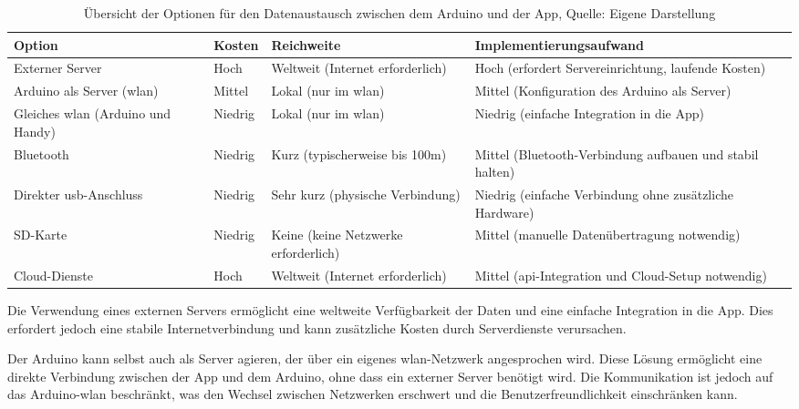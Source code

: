 \begin{table}[h!]
	\centering
	\caption{Übersicht der Optionen für den Datenaustausch zwischen dem Arduino und der App, Quelle: Eigene Darstellung}
	\label{tab:datenaustausch}
	\footnotesize
	\renewcommand{\arraystretch}{1.5} %
	\begin{tabularx}{\textwidth}{|X|X|X|>{\raggedright\arraybackslash}p{}|}
		\hline
		\textbf{Option} & \textbf{Kosten} & \textbf{Reichweite} & \textbf{Implementierungsaufwand} \\ \hline
		Externer Server & Hoch & Weltweit (Internet erforderlich) & Hoch (erfordert Servereinrichtung, laufende Kosten) \\ \hline
		Arduino als Server (\ac{wlan}) & Mittel & Lokal (nur im \ac{wlan}) & Mittel (Konfiguration des Arduino als Server) \\ \hline
		Gleiches \ac{wlan} (Arduino und Handy) & Niedrig & Lokal (nur im \ac{wlan}) & Niedrig (einfache Integration in die App) \\ \hline
		Bluetooth & Niedrig & Kurz (typischerweise bis 100m) & Mittel (Bluetooth-Verbindung aufbauen und stabil halten) \\ \hline
		Direkter \ac{usb}-Anschluss & Niedrig & Sehr kurz (physische Verbindung) & Niedrig (einfache Verbindung ohne zusätzliche Hardware) \\ \hline
		SD-Karte & Niedrig & Keine (keine Netzwerke erforderlich) & Mittel (manuelle Datenübertragung notwendig) \\ \hline
		Cloud-Dienste & Hoch & Weltweit (Internet erforderlich) & Mittel (\ac{api}-Integration und Cloud-Setup notwendig) \\ \hline
	\end{tabularx}
\end{table}


Die Verwendung eines externen Servers ermöglicht eine weltweite Verfügbarkeit der Daten und eine einfache Integration in die App. Dies erfordert jedoch eine stabile Internetverbindung und kann zusätzliche Kosten durch Serverdienste verursachen.

Der Arduino kann selbst auch als Server agieren, der über ein eigenes \ac{wlan}-Netzwerk angesprochen wird. Diese Lösung ermöglicht eine direkte Verbindung zwischen der App und dem Arduino, ohne dass ein externer Server benötigt wird. Die Kommunikation ist jedoch auf das Arduino-\ac{wlan} beschränkt, was den Wechsel zwischen Netzwerken erschwert und die Benutzerfreundlichkeit einschränken kann.

